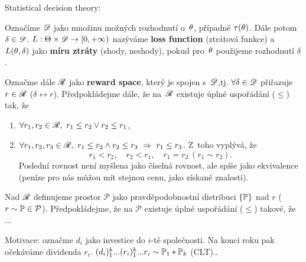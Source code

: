 Statistical decision theory:

\begin{define}
	Označíme $\mathscr{D}$ jako množinu možných rozhodnutí o~$\theta$, případně $\tau(\theta)$. Dále potom $\delta\in\mathscr{D}$. $L:\Theta\times\mathscr{D}\to[0,+\infty)$ nazýváme \textbf{loss function} (ztrátová funkce) a~$L(\theta,\delta)$ jako \textbf{míru ztráty} (shody, neshody), pokud pro~$\theta$ použijeme rozhodnutí $\delta$.
	
	Označme dále $\mathscr{R}$ jako \textbf{reward space}, který je spojen s~$\mathscr{D}$,tj. $\forall\delta\in\mathscr{D}$ přiřazuje $r\in\mathscr{R}$ ($\delta\leftrightarrow r$). Předpokládejme dále, že na~$\mathscr{R}$ existuje úplné uspořádání ($\leq$) tak, že \begin{enumerate}[A1)]
		\item $\forall r_1,r_2\in\mathscr{R},~r_1\leq r_2 \vee r_2\leq r_1$,
		\item $\forall r_1,r_2,r_3\in\mathscr{R},~r_1\leq r_2 \wedge r_2\leq r_3~\Rightarrow~r_1\leq r_3$. Z~toho vyplývá, že 
		$$ r_1<r_2,\quad r_2<r_1,\quad r_1=r_2~(r_1\sim r_2).$$
		Poslední rovnost není myšlena jako číselná rovnost, ale spíše jako ekvivalence (peníze pro nás můžou mít stejnou cenu, jako získané znalosti).
	\end{enumerate}
Nad $\mathscr{R}$ definujeme prostor $\mathcal{P}$ jako pravděpodobnostní distribuci $\{\mathbb{P}\}$ nad $r$ ($r\sim\mathbb{P}\in\mathcal{P}$). Předpokládejme, že na $\mathcal{P}$ existuje úplné uspořádání ($\leq$) takové, že ...
\end{define}

Motivace: označme $d_i$ jako investice do $i$-té společnosti. Na konci roku pak očekáváme dividenda $r_i$. $(d_i)_1^k...(r_i)_1^k...r_i\sim \mathbb{P}_1\ast\mathbb{P}_k$ (CLT)..